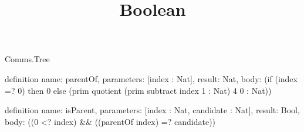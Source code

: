 \begin{lexlean}{Comms.Tree}
\title{Boolean}
\begin{semanticmodule}
definition{
  name: parentOf,
  parameters: [index : Nat],
  result: Nat,
  body: (if (index =? 0) then 0 else (prim quotient (prim subtract index 1 : Nat) 4 0 : Nat))
}

definition{
  name: isParent,
  parameters: [index : Nat, candidate : Nat],
  result: Bool,
  body: ((0 <? index) && ((parentOf index) =? candidate))
}
\end{semanticmodule}
\end{lexlean}

